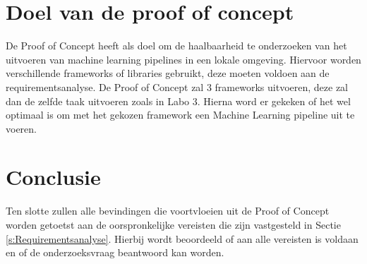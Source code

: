 \section{Doel van de proof of concept}
De Proof of Concept heeft als doel om de haalbaarheid te onderzoeken van het uitvoeren van machine learning pipelines in een lokale omgeving. Hiervoor worden verschillende frameworks of libraries  gebruikt, deze moeten voldoen aan de requirementsanalyse.
De Proof of Concept zal 3 frameworks uitvoeren, deze zal dan de zelfde taak uitvoeren zoals in Labo 3. Hierna word er gekeken of het wel optimaal is om met het gekozen framework een Machine Learning pipeline uit te voeren.
\section{Conclusie}
Ten slotte zullen alle bevindingen die voortvloeien uit de Proof of Concept worden getoetst aan de oorspronkelijke vereisten die zijn vastgesteld in Sectie \ref{s:Requirementsanalyse}. Hierbij
wordt beoordeeld of aan alle vereisten is voldaan en of de onderzoeksvraag beantwoord kan worden.

